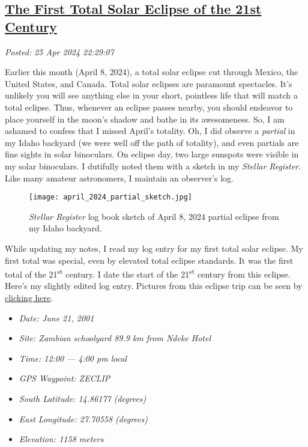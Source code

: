 %

\subsection*{\href{http://analyzethedatanotthedrivel.org/2024/04/25/the-first-total-solar-eclipse-of-the-21st-century/}{The First Total Solar Eclipse of the 21st Century}}


\noindent\emph{Posted: 25 Apr 2024 22:29:07}
\vspace{6pt}

Earlier this month (April 8, 2024), a total solar eclipse cut through
Mexico, the United States, and Canada. Total solar eclipses are
paramount spectacles. It's unlikely you will see anything else in your
short, pointless life that will match a total eclipse.
Thus, whenever an
eclipse passes nearby, you should endeavor to place yourself in the
moon's shadow and bathe in its awesomeness. So, I am ashamed to confess
that I missed April's totality. Oh, I did observe a \emph{partial} in my
Idaho backyard (we were well off the path of totality), and even
partials are fine sights in solar binoculars. On eclipse day, two large
sunspots were visible in my solar binoculars. I dutifully noted them
with a sketch in my \emph{Stellar Register}. Like many amateur
astronomers, I maintain an observer's log.

\captionsetup[figure]{labelformat=empty}
\begin{SCfigure}
\centering
\texttt{[image: april\_2024\_partial\_sketch.jpg]}
\caption[\emph{Stellar Register} log book sketch of April 8, 2024 partial eclipse]{\emph{Stellar Register} log book sketch of April 8, 2024
partial eclipse from my Idaho backyard.}
\label{fig:8074X0}
\end{SCfigure}

While updating my notes, I read my log entry for my first total solar
eclipse. My first total was special, even by elevated total eclipse standards. It
was the first total of the 21\textsuperscript{st} century. I date the
start of the 21\textsuperscript{st} century from this eclipse. Here's my
slightly edited log entry. Pictures from this eclipse trip can be seen
by \href{https://conceptcontrol.smugmug.com/Trips/Overseas/Zambia-Eclipse-Trip-1}{clicking here}.


\begin{itemize}
\tightlist
\item[] %
  \emph{Date: June 21, 2001}
\item[]
  \emph{Site: Zambian schoolyard 89.9 km from Ndeke Hotel}
\item[]
  \emph{Time: 12:00} \emph{--- 4:00 pm local}
\item[]
  \emph{GPS Waypoint: ZECLIP}
\item[]
  \emph{South Latitude: 14.86177} \emph{(degrees)}
\item[]
  \emph{East Longitude: 27.70558 (degrees)}
\item[]
  \emph{Elevation: 1158 meters}
\end{itemize}

